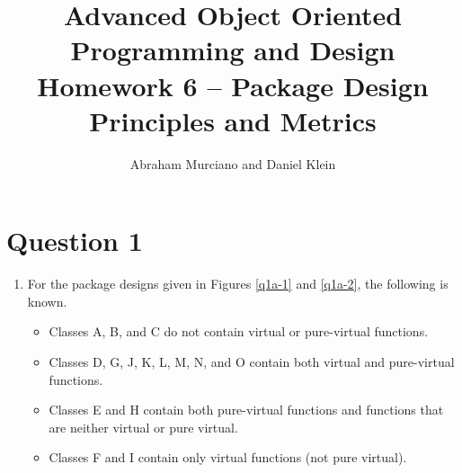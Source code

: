\documentclass{article}
\title{Advanced Object Oriented Programming and Design\\
\medskip
\large Homework 6 -- Package Design Principles and Metrics}
\author{Abraham Murciano and Daniel Klein}
\begin{document}
\maketitle

\section*{Question 1}

\begin{enumerate}[label=\alph*.]
	\item
		For the package designs given in Figures \ref{q1a-1} and \ref{q1a-2}, the following is known.
		\begin{itemize}
			\item Classes A, B, and C do not contain virtual or pure-virtual functions.
			\item Classes D, G, J, K, L, M, N, and O contain both virtual and pure-virtual functions.
			\item Classes E and H contain both pure-virtual functions and functions that are neither virtual or pure virtual.
			\item Classes F and I contain only virtual functions (not pure virtual).
		\end{itemize}


\end{enumerate}
\end{document}

